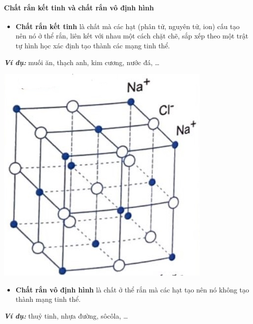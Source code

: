 \begin{tomtat}
\paragraph{Chất rắn kết tinh và chất rắn vô định hình}
\begin{dn}
	\begin{itemize}
		\item \textbf{Chất rắn kết tinh} là chất mà các hạt (phân tử, nguyên tử, ion) cấu tạo nên nó ở thể rắn, liên kết với nhau một cách chặt chẽ, sắp xếp theo một trật tự hình học xác định tạo thành các mạng tinh thể.
	\end{itemize}
\end{dn}
\textit{\textbf{Ví dụ:}} muối ăn, thạch anh, kim cương, nước đá, \dots
	\begin{center}
		\includegraphics[width=0.2\linewidth]{figs/VN12-Y24-PH-SYL-001-3}
	\end{center}
	\begin{dn}
		\begin{itemize}
		\item \textbf{Chất rắn vô định hình} là chất ở thể rắn mà các hạt tạo nên nó không tạo thành mạng tinh thể.\\
	\end{itemize}
	\end{dn}
	\textbf{\textit{Ví dụ:}} thuỷ tinh, nhựa đường, sôcôla, \dots

\end{tomtat}
